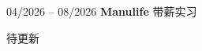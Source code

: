\begin{twocolentry}{04/2026 – 08/2026} \textbf{Manulife}
\newline 带薪实习 \end{twocolentry}
\begin{onecolentry}
\begin{highlights}
\item 待更新
\end{highlights}
\end{onecolentry}
